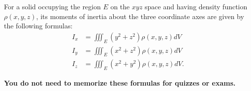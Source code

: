 \documentclass{article}
\begin{document}
For a solid occupying the region $E$ on the $xyz$ space and having density function $\rho(x,y,z)$, its moments of inertia about the three coordinate axes are given by the following formulas:
\begin{align}
I_x&=\iiint_E(y^2+z^2)\rho(x,y,z)dV\\
I_y&=\iiint_E(x^2+z^2)\rho(x,y,z)dV\\
I_z&=\iiint_E(x^2+y^2)\rho(x,y,z)dV.
\end{align}

\textbf{You do not need to memorize these formulas for quizzes or exams.}
\end{document}
